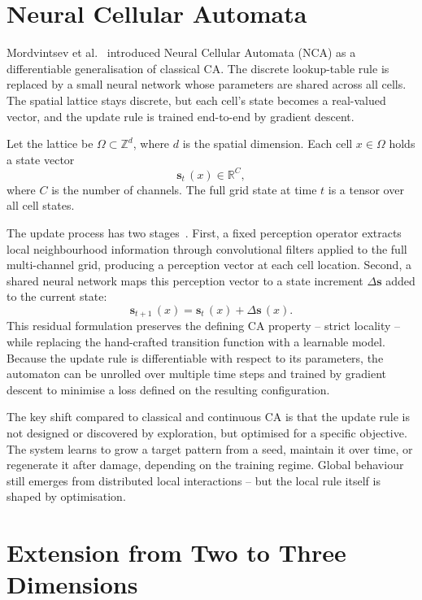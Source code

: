 \section{Neural Cellular Automata}

Mordvintsev et al.~\cite{Mordvintsev2020} introduced Neural Cellular Automata (NCA)
as a differentiable generalisation of classical CA. The discrete lookup-table rule is
replaced by a small neural network whose parameters are shared across all cells. The
spatial lattice stays discrete, but each cell's state becomes a real-valued vector,
and the update rule is trained end-to-end by gradient descent.

Let the lattice be $\Omega \subset \mathbb{Z}^d$, where $d$ is the spatial dimension.
Each cell $x \in \Omega$ holds a state vector
\[
\mathbf{s}_t\,(x) \in \mathbb{R}^{C},
\]
where $C$ is the number of channels. The full grid state at time $t$ is a tensor over
all cell states.

The update process has two stages~\cite{Mordvintsev2020}. First, a fixed perception
operator extracts local neighbourhood information through convolutional filters applied
to the full multi-channel grid, producing a perception vector at each cell location.
Second, a shared neural network maps this perception vector to a state increment
$\Delta \mathbf{s}$ added to the current state:
\[
\mathbf{s}_{t+1}\,(x) = \mathbf{s}_t\,(x) + \Delta \mathbf{s}\,(x).
\]
This residual formulation preserves the defining CA property -- strict locality --
while replacing the hand-crafted transition function with a learnable model. Because
the update rule is differentiable with respect to its parameters, the automaton can
be unrolled over multiple time steps and trained by gradient descent to minimise a
loss defined on the resulting configuration.

The key shift compared to classical and continuous CA is that the update rule is not
designed or discovered by exploration, but optimised for a specific objective. The
system learns to grow a target pattern from a seed, maintain it over time, or
regenerate it after damage, depending on the training regime. Global behaviour still
emerges from distributed local interactions -- but the local rule itself is shaped by
optimisation.

\section{Extension from Two to Three Dimensions}

